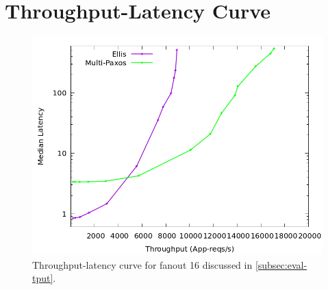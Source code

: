 \section{Throughput-Latency Curve}
\label{sec:tput}
\begin{figure}[h]
\centering
  \includegraphics[width=\linewidth]{figs/tput/tput-lat-p50-log.png}
  \vspace{3pt}
\caption{Throughput-latency curve for fanout 16 discussed in \cref{subsec:eval-tput}.} 
\label{fig:tput}
\end{figure}
